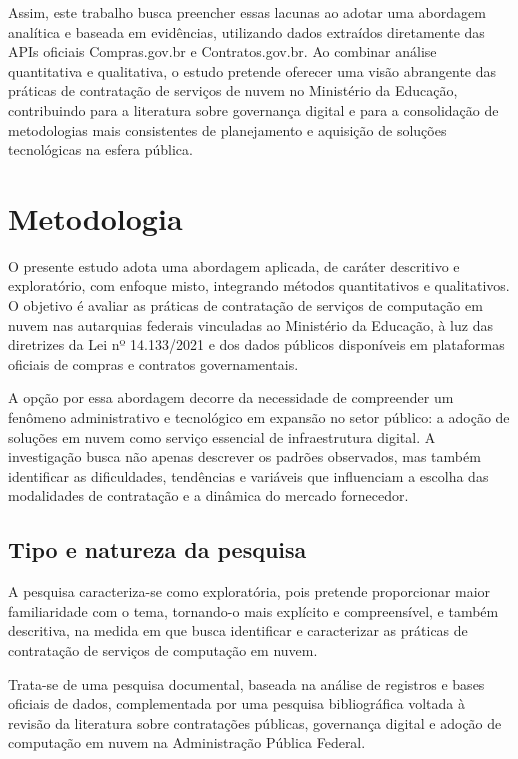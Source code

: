 \documentclass[a4paper, 12pt,brazil]{article}
\begin{document}
Assim, este trabalho busca preencher essas lacunas ao adotar uma abordagem analítica e baseada em evidências, utilizando dados extraídos diretamente das APIs oficiais Compras.gov.br e Contratos.gov.br. Ao combinar análise quantitativa e qualitativa, o estudo pretende oferecer uma visão abrangente das práticas de contratação de serviços de nuvem no Ministério da Educação, contribuindo para a literatura sobre governança digital e para a consolidação de metodologias mais consistentes de planejamento e aquisição de soluções tecnológicas na esfera pública.



\section{Metodologia}

O presente estudo adota uma abordagem aplicada, de caráter descritivo e exploratório, com enfoque misto, integrando métodos quantitativos e qualitativos. O objetivo é avaliar as práticas de contratação de serviços de computação em nuvem nas autarquias federais vinculadas ao Ministério da Educação, à luz das diretrizes da Lei nº 14.133/2021 e dos dados públicos disponíveis em plataformas oficiais de compras e contratos governamentais.

A opção por essa abordagem decorre da necessidade de compreender um fenômeno administrativo e tecnológico em expansão no setor público: a adoção de soluções em nuvem como serviço essencial de infraestrutura digital. A investigação busca não apenas descrever os padrões observados, mas também identificar as dificuldades, tendências e variáveis que influenciam a escolha das modalidades de contratação e a dinâmica do mercado fornecedor.

\subsection{Tipo e natureza da pesquisa}

A pesquisa caracteriza-se como exploratória, pois pretende proporcionar maior familiaridade com o tema, tornando-o mais explícito e compreensível, e também descritiva, na medida em que busca identificar e caracterizar as práticas de contratação de serviços de computação em nuvem.

Trata-se de uma pesquisa documental, baseada na análise de registros e bases oficiais de dados, complementada por uma pesquisa bibliográfica voltada à revisão da literatura sobre contratações públicas, governança digital e adoção de computação em nuvem na Administração Pública Federal.
\end{document}
